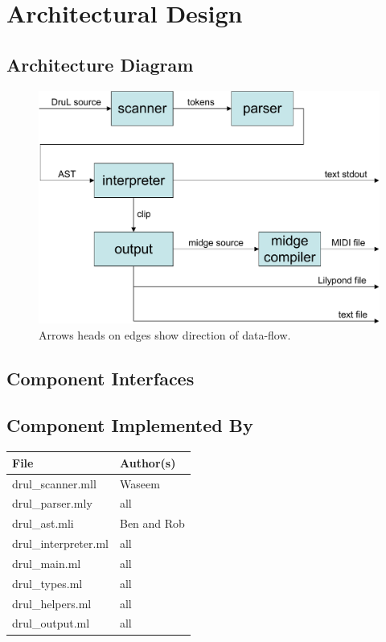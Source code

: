 
\chapter{Architectural Design}

\section{Architecture Diagram}

\begin{figure}[h]
\begin{center}
\includegraphics[width=.9\columnwidth]{Architecture_diagram.pdf}
\caption{Arrows heads on edges show direction of data-flow.}
\end{center}
\end{figure}

\section{Component Interfaces}

\section{Component Implemented By}

\begin{tabular}{ | l | l | } \hline
	\textbf{File}        & \textbf{Author(s)} \\ \hline \hline
	drul\_scanner.mll    & Waseem             \\ \hline
	drul\_parser.mly     & all                \\ \hline
	drul\_ast.mli        & Ben and Rob        \\ \hline
	drul\_interpreter.ml & all                \\ \hline
	drul\_main.ml        & all                \\ \hline
	drul\_types.ml       & all                \\ \hline
	drul\_helpers.ml     & all                \\ \hline
	drul\_output.ml      & all                \\ \hline
\end{tabular}

